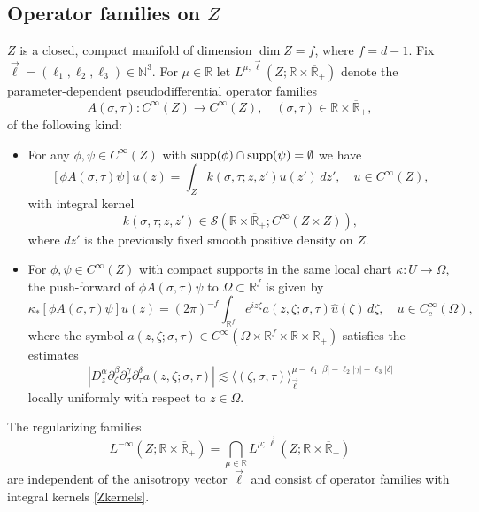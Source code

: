 \documentclass[reqno]{amsart}
\numberwithin{equation}{section}
\theoremstyle{definition}
\def\N{\mathbb N}
\def\R{\mathbb R}
\def\S{\mathscr S}
\begin{document}
\subsection{Operator families on {\boldmath $Z$}}\label{sec-ZFamilies}
 
$Z$ is a closed, compact manifold of dimension $\dim Z = f$, where $f=d-1$. Fix $\vec{\ell} = (\ell_1,\ell_2,\ell_3) \in \N^3$. For $\mu \in \R$ let $L^{\mu;\vec{\ell}}(Z;\R\times\overline{\R}_{+})$ denote the parameter-dependent pseudodifferential operator families
$$
A(\sigma,\tau) : C^{\infty}(Z) \to C^{\infty}(Z), \quad (\sigma,\tau) \in \R\times\overline{\R}_+,
$$
of the following kind:
\begin{itemize}
\item For any $\phi,\psi \in C^{\infty}(Z)$ with $\textup{supp}(\phi)\cap\textup{supp}(\psi) = \emptyset$ we have
$$
[\phi A(\sigma,\tau)\psi]u(z) = \int_{Z}k(\sigma,\tau;z,z')u(z')\,dz', \quad u \in C^{\infty}(Z),
$$
with integral kernel
\begin{equation}\label{Zkernels}
k(\sigma,\tau;z,z') \in \S(\R\times\overline{\R}_{+};C^{\infty}(Z\times Z)),
\end{equation}
where $dz'$ is the previously fixed smooth positive density on $Z$.
\item For $\phi,\psi \in C^{\infty}(Z)$ with compact supports in the same local chart $\kappa : U \to \Omega$, the push-forward of $\phi A(\sigma,\tau) \psi$ to $\Omega \subset \R^f$ is given by
$$
\kappa_*[\phi A(\sigma,\tau) \psi] u(z) = (2\pi)^{-f} \int_{\R^f} e^{iz\zeta}a(z,\zeta;\sigma,\tau)\hat{u}(\zeta)\,d\zeta,  \quad u \in C_c^{\infty}(\Omega),
$$
where the symbol $a(z,\zeta;\sigma,\tau) \in C^{\infty}(\Omega\times\R^f\times\R\times\overline{\R}_{+})$ satisfies the estimates
\begin{equation}\label{symbolestimate}
|D^{\alpha}_z\partial^{\beta}_{\zeta}\partial^{\gamma}_{\sigma}\partial^{\delta}_{\tau}a(z,\zeta;\sigma,\tau)| \lesssim \langle (\zeta,\sigma,\tau) \rangle_{\vec{\ell}}^{\mu-\ell_1|\beta|-\ell_2|\gamma|-\ell_3|\delta|}
\end{equation}
locally uniformly with respect to $z \in \Omega$.
\end{itemize}
The regularizing families
$$
L^{-\infty}(Z;\R\times\overline{\R}_{+}) = \bigcap_{\mu \in \R} L^{\mu;\vec{\ell}}(Z;\R\times\overline{\R}_{+})
$$
are independent of the anisotropy vector $\vec{\ell}$ and consist of operator families with integral kernels \eqref{Zkernels}.
\end{document}
